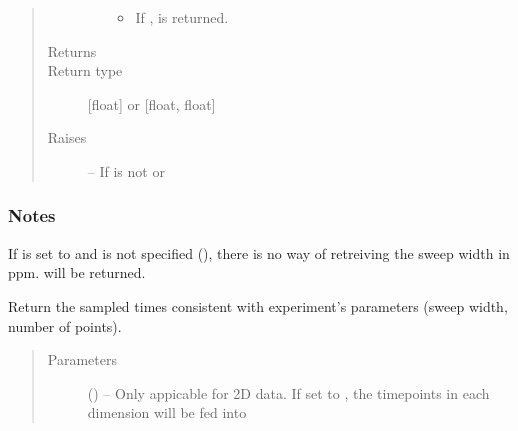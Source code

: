 \documentclass[letterpaper,10pt,english]{sphinxmanual}
\begin{document}
\begin{fulllineitems}
\begin{fulllineitems}
\begin{quote}
\begin{description}
\begin{itemize}
\begin{itemize}
\item {} 
\sphinxAtStartPar
If ,  is returned.

\end{itemize}


\end{itemize}

\item[{Returns}] \leavevmode
\sphinxAtStartPar
{}

\item[{Return type}] \leavevmode
\sphinxAtStartPar
{[}float{]} or {[}float, float{]}

\item[{Raises}] \leavevmode
\sphinxAtStartPar
{\hyperref[\detokenize{references/errors:nmrespy._errors.InvalidUnitError}]{}} – If  is not  or 

\end{description}\end{quote}
\subsubsection*{Notes}

\sphinxAtStartPar
If  is set to  and  is not specified
(), there is no way of retreiving the sweep width in ppm.
 will be returned.

\end{fulllineitems}


\begin{fulllineitems}
\label{\detokenize{references/core:nmrespy.core.Estimator.get_timepoints}}
\sphinxAtStartPar
Return the sampled times consistent with experiment’s
parameters (sweep width, number of points).
\begin{quote}\begin{description}
\item[{Parameters}] \leavevmode
\sphinxAtStartPar
{} () – 
\sphinxAtStartPar
Only appicable for 2D data. If set to , the time\sphinxhyphen{}points in
each dimension will be fed into



\end{description}
\end{quote}
\end{fulllineitems}
\end{fulllineitems}
\end{document}
